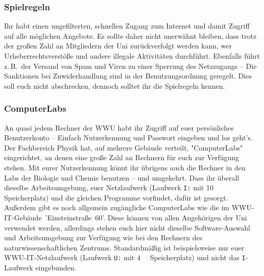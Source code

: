 \begin{multicols*}{2}
\subsubsection{Spielregeln}
Ihr habt einen ungefilterten, schnellen Zugang zum Internet und damit Zugriff auf alle möglichen Angebote.
Es sollte daher nicht unerwähnt bleiben, dass trotz der großen Zahl an Mitgliedern der Uni zurückverfolgt werden kann, wer Urheberrechtsverstöße und andere illegale Aktivitäten durchführt.
Ebenfalls führt z.\,B.\ der Versand von Spam und Viren zu einer Sperrung des Netzzugangs -- Die Sanktionen bei Zuwiderhandlung sind in der Benutzungsordnung geregelt.
Dies soll euch nicht abschrecken, dennoch solltet ihr die Spielregeln kennen.

\subsubsection{ComputerLabs}
An quasi jedem Rechner der WWU habt ihr Zugriff auf euer persönliches Benutzerkonto -- Einfach Nutzerkennung und Passwort eingeben und los geht's.
Der Fachbereich Physik hat, auf mehrere Gebäude verteilt, "ComputerLabs" eingerichtet, an denen eine große Zahl an Rechnern für euch zur Verfügung stehen.
Mit eurer Nutzerkennung könnt ihr übrigens auch die Rechner in den Labs der Biologie und Chemie benutzen -- und umgekehrt.
Dass ihr überall dieselbe Arbeitsumgebung, euer Netzlaufwerk (Laufwerk \texttt{I:} mit \SI{10}{\giga\byte} Speicherplatz) und die gleichen Programme vorfindet, dafür ist gesorgt.
Außerdem gibt es noch allgemein zugängliche ComputerLabs wie die im WWU-IT-Gebäude~'Einsteinstraße~60'.
Diese können von allen Angehörigen der Uni verwendet werden, allerdings stehen euch hier nicht dieselbe Software-Auswahl und Arbeitsumgebung zur Verfügung wie bei den Rechnern des naturwissenschaftlichen Zentrums.
Standardmäßig ist beispielsweise nur euer WWU-IT-Netzlaufwerk (Laufwerk \texttt{U:} mit \SI{4}{\giga\byte} Speicherplatz) und nicht das \texttt{I}-Laufwerk eingebunden.


\end{multicols*}
